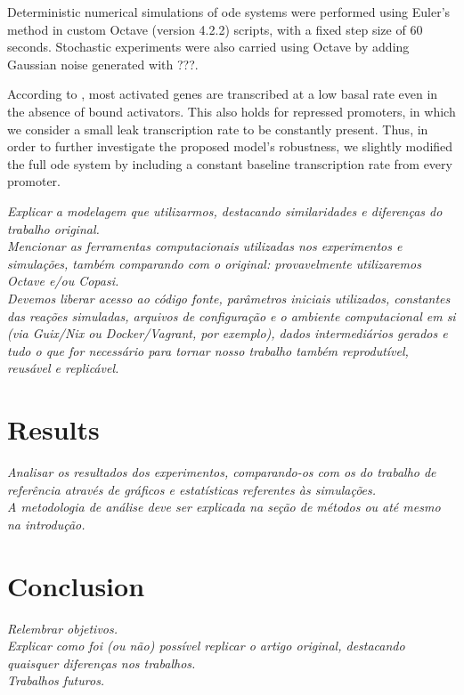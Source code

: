   Deterministic numerical simulations of \ac{ode} systems were performed using Euler's method in custom Octave (version 4.2.2) scripts, with a fixed step size of 60 seconds.
  Stochastic experiments were also carried using Octave by adding Gaussian noise generated with ???.

  According to \citet{ingalls}, most activated genes are transcribed at a low basal rate even in the absence of bound activators.
  This also holds for repressed promoters, in which we consider a small leak transcription rate to be constantly present.
  Thus, in order to further investigate the proposed model's robustness, we slightly modified the full \ac{ode} system by including a constant baseline transcription rate from every promoter.

  \textit{Explicar a modelagem que utilizarmos, destacando similaridades e diferenças do trabalho original.\\
  Mencionar as ferramentas computacionais utilizadas nos experimentos e simulações, também comparando com o original: provavelmente utilizaremos \textit{Octave} e/ou \textit{Copasi}.\\
  Devemos liberar acesso ao código fonte, parâmetros iniciais utilizados, constantes das reações simuladas, arquivos de configuração e o ambiente computacional em si (via Guix/Nix ou Docker/Vagrant, por exemplo), dados intermediários gerados e tudo o que for necessário para tornar nosso trabalho também reprodutível, reusável e replicável.\\}


\section{Results}

  \textit{Analisar os resultados dos experimentos, comparando-os com os do trabalho de referência através de gráficos e estatísticas referentes às simulações.\\
  A metodologia de análise deve ser explicada na seção de métodos ou até mesmo na introdução.\\}


\section{Conclusion}

  \textit{Relembrar objetivos.\\
  Explicar como foi (ou não) possível replicar o artigo original, destacando quaisquer diferenças nos trabalhos.\\
  Trabalhos futuros.\\}

